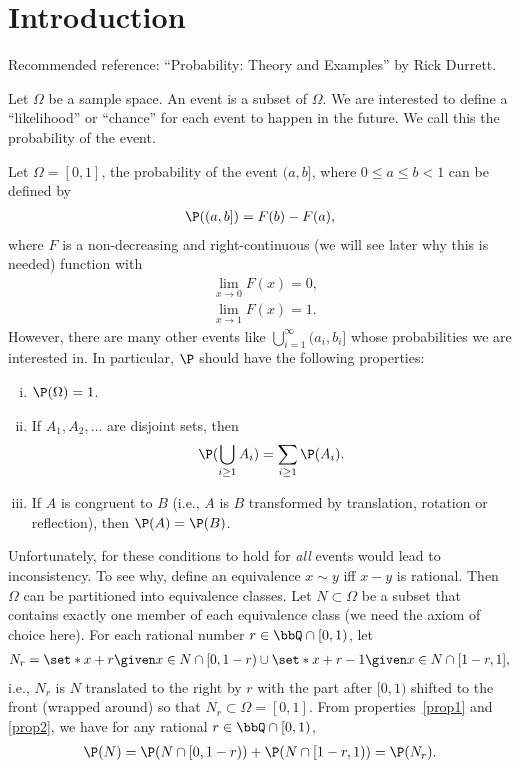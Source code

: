 \documentclass[../aipt.tex]{subfiles}
\begin{document}


\section{Introduction}

Recommended reference: ``Probability: Theory and Examples'' by Rick Durrett.

Let $\Omega$ be a sample space. An event is a subset of $\Omega$. We are interested to define a ``likelihood'' or ``chance'' for each event to happen in the future. We call this the probability of the event.
 
\begin{Example}\label{wk3:example1}
Let $\Omega = [0,1]$, the probability of the event $(a, b]$, where $0\leq a \leq b < 1$ can be defined by
\begin{align*}
\P({(a, b]}) = F(b) - F(a),
\end{align*}
where $F$ is a non-decreasing and right-continuous (we will see later why this is needed) function  with
\begin{align*}
&\lim_{x \to 0} F(x) = 0, \\
&\lim_{x \to 1} F(x) = 1.
\end{align*}
However, there are many other events like $\bigcup\limits_{i=1}^{\infty} (a_i,b_i]$ whose probabilities we are interested in. In particular, $\P$ should have the following properties:
\begin{enumerate}[(i)]
	\item\label{prop3} $\P(\Omega)=1$.
	\item\label{prop1} If $A_1, A_2, \ldots$ are disjoint sets, then
		\begin{align*}
		\P(\bigcup_{i\geq1} A_i) = \sum_{i\geq1} \P(A_i).
		\end{align*}
	\item\label{prop2} If $A$ is congruent to $B$ (i.e., $A$ is $B$ transformed by translation, rotation or reflection), then $\P(A)=\P(B)$.
\end{enumerate}
Unfortunately, for these conditions to hold for \emph{all} events would lead to inconsistency. To see why, define an equivalence $x \sim y$ iff $x - y$ is rational. Then $\Omega$ can be partitioned into equivalence classes. Let $N \subset \Omega$ be a subset that contains exactly one member of each equivalence class (we need the axiom of choice here). For each rational number $r \in \bbQ\cap [0,1)$, let
\begin{align*}
N_r = \set*{x+r \given x \in N\cap [0,1-r)} \cup \set*{x+r-1 \given x \in N\cap [1-r,1]},
\end{align*}
i.e., $N_r$ is $N$ translated to the right by $r$ with the part after $[0,1)$ shifted to the front (wrapped around) so that $N_r \subset \Omega=[0,1]$. From properties~\ref{prop1} and \ref{prop2}, we have for any rational $r \in\bbQ\cap [0,1)$,
\begin{align}\label{eq:N_r}
\P(N) = \P(N\cap [0,1-r)) + \P(N\cap [1-r,1)) = \P(N_r).
\end{align}


\end{Example}
\end{document}
